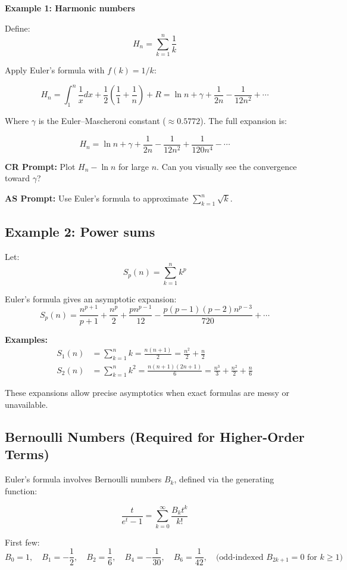 \documentclass{article}
\begin{document}
\textbf{Example 1: Harmonic numbers}

Define:
\[
H_n = \sum_{k=1}^{n} \frac{1}{k}
\]

Apply Euler’s formula with $f(k) = 1/k$:

\[
H_n = \int_1^n \frac{1}{x} dx + \frac{1}{2} \left( \frac{1}{1} + \frac{1}{n} \right) + R
= \ln n + \gamma + \frac{1}{2n} - \frac{1}{12n^2} + \cdots
\]

Where $\gamma$ is the Euler–Mascheroni constant ($\approx 0.5772$). The full expansion is:

\[
H_n = \ln n + \gamma + \frac{1}{2n} - \frac{1}{12n^2} + \frac{1}{120n^4} - \cdots
\]

\textbf{CR Prompt:} Plot $H_n - \ln n$ for large $n$. Can you visually see the convergence toward $\gamma$?

\textbf{AS Prompt:} Use Euler’s formula to approximate $\sum_{k=1}^{n} \sqrt{k}$.

\subsection*{Example 2: Power sums}

Let:
\[
S_p(n) = \sum_{k=1}^n k^p
\]

Euler’s formula gives an asymptotic expansion:
\[
S_p(n) = \frac{n^{p+1}}{p+1} + \frac{n^p}{2} + \frac{p n^{p-1}}{12} - \frac{p(p-1)(p-2) n^{p-3}}{720} + \cdots
\]

\textbf{Examples:}
\begin{align*}
S_1(n) &= \sum_{k=1}^n k = \frac{n(n+1)}{2} = \frac{n^2}{2} + \frac{n}{2} \\
S_2(n) &= \sum_{k=1}^n k^2 = \frac{n(n+1)(2n+1)}{6} = \frac{n^3}{3} + \frac{n^2}{2} + \frac{n}{6}
\end{align*}

These expansions allow precise asymptotics when exact formulas are messy or unavailable.

\subsection*{Bernoulli Numbers (Required for Higher-Order Terms)}

Euler’s formula involves Bernoulli numbers $B_k$, defined via the generating function:

\[
\frac{t}{e^t - 1} = \sum_{k=0}^\infty \frac{B_k t^k}{k!}
\]

First few:
\[
B_0 = 1, \quad B_1 = -\frac{1}{2}, \quad B_2 = \frac{1}{6}, \quad B_4 = -\frac{1}{30}, \quad B_6 = \frac{1}{42}, \quad \text{(odd-indexed } B_{2k+1} = 0 \text{ for } k \ge 1)
\]
\end{document}
